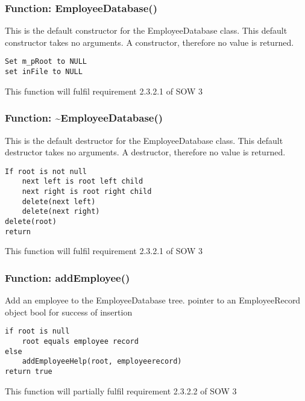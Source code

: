 \documentclass[12pt]{article}%
\newcounter{subsubsubsection}[subsubsection]
\begin{document}
\subsubsection{Function: EmployeeDatabase()}
This is the default constructor for the EmployeeDatabase class.
This default constructor takes no arguments.
A constructor, therefore no value is returned.
\begin{verbatim}
Set m_pRoot to NULL
set inFile to NULL
\end{verbatim}
This function will fulfil requirement 2.3.2.1 of SOW 3

\subsubsection{Function: \textasciitilde EmployeeDatabase()}
This is the default destructor for the EmployeeDatabase class.
This default destructor takes no arguments.
A destructor, therefore no value is returned.
\begin{verbatim}
If root is not null
    next left is root left child
    next right is root right child
    delete(next left)
    delete(next right)
delete(root)
return
\end{verbatim}
This function will fulfil requirement 2.3.2.1 of SOW 3

\subsubsection{Function: addEmployee()}
Add an employee to the EmployeeDatabase tree.
pointer to an EmployeeRecord object
bool for success of insertion
\begin{verbatim}
if root is null
    root equals employee record
else
    addEmployeeHelp(root, employeerecord)
return true
\end{verbatim}
This function will partially fulfil requirement 2.3.2.2 of SOW 3
\end{document}
